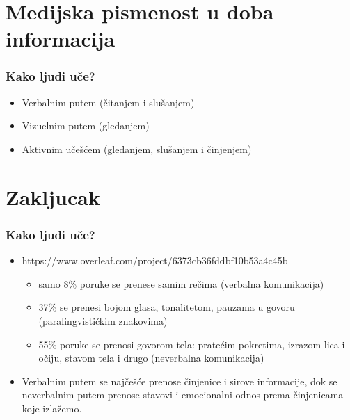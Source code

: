 \documentclass{beamer}
\begin{document}
\section{Medijska pismenost u doba informacija}

\begin{frame}[fragile]\frametitle{Kako ljudi uče?}
	\begin{itemize}	
		\item Verbalnim putem (čitanjem i slušanjem)
		\item Vizuelnim putem (gledanjem)
		\item Aktivnim učešćem (gledanjem, slušanjem i činjenjem)
	\end{itemize}
\end{frame}


\section{Zakljucak}

\begin{frame}[fragile]\frametitle{Kako ljudi uče?}
	\begin{itemize}	
		\item https://www.overleaf.com/project/6373cb36fddbf10b53a4c45b
		\begin{itemize}
			\item samo 8\% poruke se prenese samim rečima (verbalna komunikacija)
			\item 37\% se prenesi bojom glasa, tonalitetom, pauzama u govoru (paralingvističkim znakovima)
			\item 55\% poruke se prenosi govorom tela: pratećim pokretima, izrazom lica i
			očiju, stavom tela i drugo (neverbalna komunikacija)
		\end{itemize}
		\item Verbalnim putem se najčešće prenose činjenice i
		sirove informacije, dok se neverbalnim putem prenose stavovi i
		emocionalni odnos prema činjenicama koje izlažemo.
	\end{itemize}
\end{frame}
\end{document}
